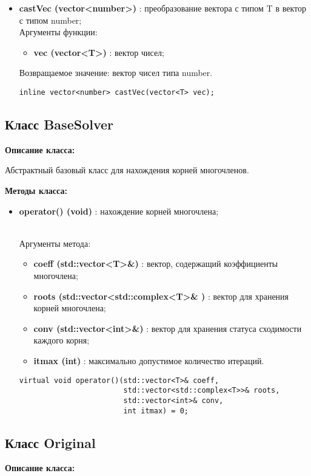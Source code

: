 \documentclass[a4paper,12pt]{article}
\begin{document}
\begin{itemize}
    \item \textbf{castVec (vector<number>)} : преобразование вектора с типом T в вектор с типом number;
    \\Аргументы функции:
    \begin{itemize}
        \renewcommand{\labelitemi}{-}
        \item \textbf{vec (vector<T>)} : вектор чисел;
    \end{itemize}
    Возвращаемое значение: вектор чисел типа number.
    \begin{lstlisting}[language=С++]
inline vector<number> castVec(vector<T> vec); \end{lstlisting}
\end{itemize}



\subsection{Класс BaseSolver}
\textbf{Описание класса:}

Абстрактный базовый класс для нахождения корней многочленов. 

\textbf{Методы класса:}
\begin{itemize}
    \item \textbf{operator() (void)} : нахождение корней многочлена;

\\Аргументы метода:
    \begin{itemize}
        \renewcommand{\labelitemi}{-}
        \item \textbf{coeff (std::vector<T>\&)} : вектор, содержащий коэффициенты многочлена;
        \item \textbf{roots (std::vector<std::complex<T>\& )} : вектор для хранения корней многочлена;
        \item \textbf{conv (std::vector<int>\&)} : вектор для хранения статуса сходимости каждого корня;
        \item \textbf{itmax (int)} : максимально допустимое количество итераций.
    \end{itemize}
\begin{lstlisting}[language=С++]
virtual void operator()(std::vector<T>& coeff, 
                        std::vector<std::complex<T>>& roots, 
                        std::vector<int>& conv, 
                        int itmax) = 0; \end{lstlisting}
\end{itemize}
\subsection{Класс Original}
\textbf{Описание класса:}
\end{document}
